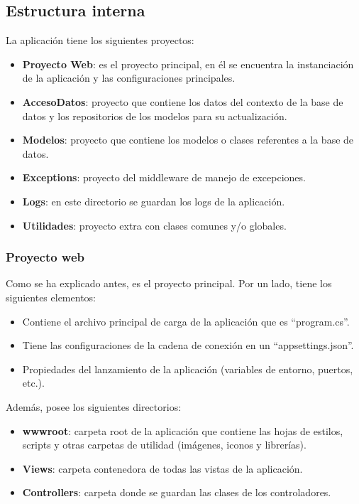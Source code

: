 \subsection{Estructura interna}
La aplicación tiene los siguientes proyectos:
\begin{itemize}
    \item \textbf{Proyecto Web}: es el proyecto principal, en él se encuentra la instanciación
    de la aplicación y las configuraciones principales.
    \item \textbf{AccesoDatos}: proyecto que contiene los datos del contexto de la base de datos
    y los repositorios de los modelos para su actualización.
    \item \textbf{Modelos}: proyecto que contiene los modelos o clases referentes a la base
    de datos.
    \item \textbf{Exceptions}: proyecto del middleware de manejo de excepciones.
    \item \textbf{Logs}: en este directorio se guardan los logs de la aplicación.
    \item \textbf{Utilidades}: proyecto extra con clases comunes y/o globales.
\end{itemize}

\subsubsection{Proyecto web}
Como se ha explicado antes, es el proyecto principal. Por un lado, tiene los siguientes elementos:
\begin{itemize}
\tightlist
    \item Contiene el archivo principal de carga de la aplicación que es ``program.cs''.
    \item Tiene las configuraciones de la cadena de conexión en un ``appsettings.json''.
    \item Propiedades del lanzamiento de la aplicación (variables de entorno, puertos, etc.).
\end{itemize}

Además, posee los siguientes directorios:
\begin{itemize}
    \item \textbf{wwwroot}: carpeta root de la aplicación que contiene las hojas de estilos, scripts
    y otras carpetas de utilidad (imágenes, iconos y librerías).
    \item \textbf{Views}: carpeta contenedora de todas las vistas de la aplicación.
    \item \textbf{Controllers}: carpeta donde se guardan las clases de los controladores.
\end{itemize}

